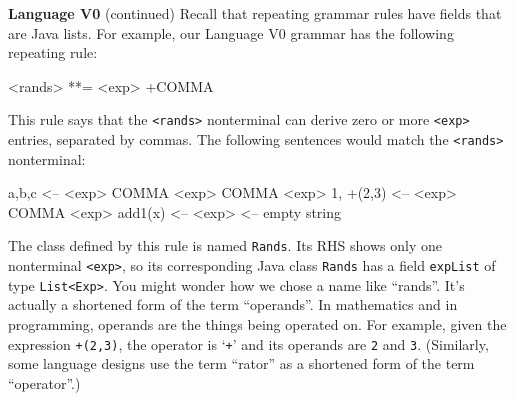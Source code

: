 \begin{minipage}[t]{\sw}
\slidenumber
\LARGE
{\bf Language V0} (continued)\exx
Recall that repeating grammar rules
have fields that are Java lists.
For example, our Language V0 grammar has the following repeating rule:
\begin{qv}
<rands> **= <exp> +COMMA
\end{qv}
This rule says that the \verb'<rands>' nonterminal
can derive zero or more \verb'<exp>' entries,
separated by commas.
The following sentences would match the \verb'<rands>' nonterminal:
\begin{qv}
a,b,c     <-- <exp> COMMA <exp> COMMA <exp>
1, +(2,3) <-- <exp> COMMA <exp>
add1(x)   <-- <exp>
          <-- empty string
\end{qv}
The class defined by this rule is named \verb'Rands'.
Its RHS shows only one nonterminal \verb'<exp>',
so its corresponding Java class \verb'Rands'
has a field \verb'expList' of type \verb'List<Exp>'.\exx
You might wonder how we chose a name like ``rands''.
It's actually a shortened form of the term ``operands''.
In mathematics and in programming,
operands are the things being operated on.
For example, given the expression \verb'+(2,3)',
the operator is `\verb'+'' and its operands are \verb'2' and \verb'3'.
(Similarly, some language designs use the term ``rator''
as a shortened form of the term ``operator''.)
\end{minipage}
\clearpage
